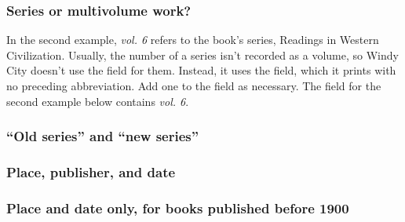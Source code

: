\documentclass[11pt,letterpaper,oneside]{article}
\begin{document}
\subsubsection{Series or multivolume work?}

In the second example, \textit{vol. 6} refers to the book's series,
Readings in Western Civilization. Usually, the number of a series
isn't recorded as a volume, so Windy City doesn't use the
 field for them. Instead, it uses the
 field, which it prints with no preceding
abbreviation. Add one to the field as necessary. The 
field for the second example below contains \textit{vol. 6}.

\begin{citebib}
\item \cite{boyer1986}
\item \cite{cochrane1987}
\end{citebib}

\setcounter{subsubsection}{125}
\subsubsection{``Old series'' and ``new series''}
\label{14.126}

\begin{citebib}
\item \cite{boxer1953}
\item \cite{palmatary1950}
\end{citebib}

\subsubsection{Place, publisher, and date}

\begin{citebib}
\item \cite{woolf1927}
\end{citebib}

\subsubsection{Place and date only, for books published before 1900}

\begin{citebib}
\item \cite{goldsmith1766}
\item \cite{cervantes1605}
\end{citebib}
\end{document}
